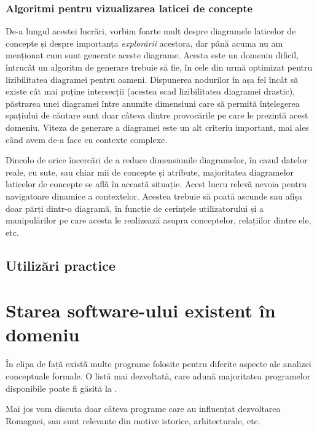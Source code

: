 \documentclass[12pt, a4paper, twoside, romanian]{teza-upb}
\begin{document}
    \subsection{Algoritmi pentru vizualizarea laticei de concepte}

      De-a lungul acestei lucrări, vorbim foarte mult despre diagramele laticelor de concepte și despre importanța \textit{explorării} acestora, dar până acuma nu am menționat cum sunt generate aceste diagrame. 
      Acesta este un domeniu dificil, întrucât un algoritm de generare trebuie să fie, în cele din urmă optimizat pentru lizibilitatea diagramei pentru oameni. Dispunerea nodurilor în așa fel încât să existe cât mai puține intersecții (acestea scad lizibilitatea diagramei drastic), păstrarea unei diagramei între anumite dimensiuni care să permită înțelegerea spațiului de căutare sunt doar câteva dintre provocările pe care le prezintă acest domeniu.
      Viteza de generare a diagramei este un alt criteriu important, mai ales când avem de-a face cu contexte complexe.

      Dincolo de orice încercări de a reduce dimensiunile diagramelor, în cazul datelor reale, cu sute, sau chiar mii de concepte și atribute, majoritatea diagramelor laticelor de concepte se află în această situație. Acest lucru relevă nevoia pentru navigatoare dinamice a contextelor. Acestea trebuie să poată ascunde sau afișa doar părți dintr-o diagramă, în funcție de cerințele utilizatorului și a manipulărilor pe care acesta le realizează asupra conceptelor, relațiilor dintre ele, etc.



  \section{Utilizări practice}
  \label{sec:utilizari-practice}


\chapter{Starea software-ului existent în domeniu}
\label{chapter:2}

  În clipa de față există multe programe folosite pentru diferite aspecte ale analizei conceptuale formale. O listă mai dezvoltată, care adună majoritatea programelor disponibile poate fi găsită la \cite{utapriss:software}.

  Mai jos vom discuta doar câteva programe care au influențat dezvoltarea Romagnei, sau sunt relevante din motive istorice, arhitecturale, etc.
\end{document}
